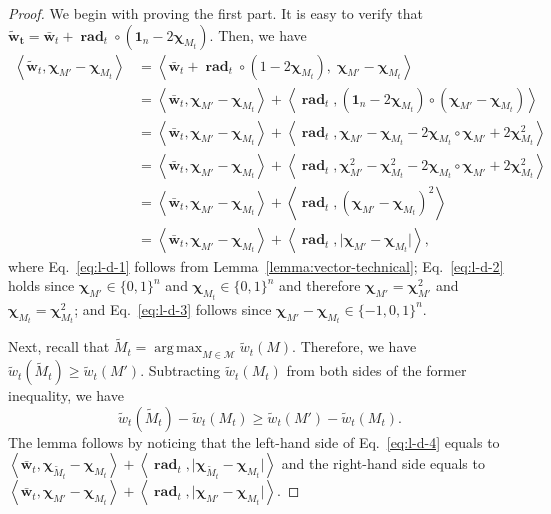 \documentclass{article}
\newcommand{\M}{\mathcal M}
\DeclareMathOperator{\rad}{rad}
\DeclareMathOperator*{\argmax}{arg\,max}
\newcommand{\inn}[1]{\left\langle #1 \right\rangle}
\renewcommand{\vec}[1]{\boldsymbol{#1}}
\renewcommand{\odot}{\circ}
\begin{document}
\begin{spacing}{1.1}
\begin{proof}
We begin with proving the first part.
It is easy to verify that $\vec {\tilde w_t} = \vec {\bar w}_t+ \vec \rad_t \odot (\vec 1_n-2\vec\chi_{M_t})$.
Then, we have
\begin{align}
\inn{\vec{\tilde w}_t, \vec \chi_{M'}-\vec \chi_{M_t}}
&= \inn{\vec {\bar w}_t+ \vec \rad_t \odot (1-2\vec\chi_{M_t}), \;\vec \chi_{M'}-\vec \chi_{M_t}} \nonumber \\
&= \inn{\vec {\bar w}_t,\vec \chi_{M'}-\vec \chi_{M_t}}+\inn{\vec \rad_t, (\vec 1_n-2\vec\chi_{M_t}) \odot (\vec \chi_{M'}-\vec \chi_{M_t})}
\label{eq:l-d-1}\\
&= \inn{\vec {\bar w}_t,\vec \chi_{M'}-\vec \chi_{M_t}}+\inn{\vec \rad_t, \vec\chi_{M'}-\vec\chi_{M_t}-2\vec\chi_{M_t}\odot\vec\chi_{M'}+2\vec\chi_{M_t}^2 } \nonumber\\
&= \inn{\vec {\bar w}_t,\vec \chi_{M'}-\vec \chi_{M_t}}+\inn{\vec \rad_t, \vec\chi_{M'}^2-\vec\chi_{M_t}^2-2\vec\chi_{M_t}\odot\vec\chi_{M'}+2\vec\chi_{M_t}^2 }
\label{eq:l-d-2}\\
&= \inn{\vec {\bar w}_t,\vec \chi_{M'}-\vec \chi_{M_t}}+\inn{\vec \rad_t, (\vec\chi_{M'}-\vec\chi_{M_t})^2}
\nonumber \\ \
&= \inn{\vec {\bar w}_t,\vec \chi_{M'}-\vec \chi_{M_t}}+\inn{\vec \rad_t, \big|\vec\chi_{M'}-\vec\chi_{M_t}\big|},
\label{eq:l-d-3}
\end{align}
where
Eq.~\eqref{eq:l-d-1} follows from Lemma~\ref{lemma:vector-technical};
Eq.~\eqref{eq:l-d-2} holds since $\vec \chi_{M'}\in \{0,1\}^n$ and $\vec \chi_{M_t}\in \{0,1\}^n$
and therefore $\vec\chi_{M'}=\vec\chi_{M'}^2$ and $\vec\chi_{M_t}=\vec\chi_{M_t}^2$;
and Eq.~\eqref{eq:l-d-3} follows since $\vec\chi_{M'}-\vec\chi_{M_t}\in \{-1,0,1\}^n$.

Next, recall that $\tilde M_t = \argmax_{M\in \M} \tilde w_t(M)$.
Therefore, we have $\tilde w_t(\tilde M_t) \ge \tilde w_t(M')$.
Subtracting $\tilde w_t(M_t)$ from both sides of the former inequality, we have
\begin{equation}
\tilde w_t(\tilde M_t)-\tilde w_t(M_t) \ge \tilde w_t(M')-\tilde w_t(M_t).
\label{eq:l-d-4}
\end{equation}
The lemma follows by noticing that the left-hand side of Eq.~\eqref{eq:l-d-4} equals to 
$\inn{\vec {\bar w}_t,\vec \chi_{\tilde M_t}-\vec \chi_{M_t}}+\inn{\vec \rad_t, \big|\vec\chi_{\tilde M_t}-\vec\chi_{M_t}\big|}$
and the right-hand side equals to
$\inn{\vec {\bar w}_t,\vec \chi_{M'}-\vec \chi_{M_t}}+\inn{\vec \rad_t, \big|\vec\chi_{M'}-\vec\chi_{M_t}\big|}$.
\end{proof}



\end{spacing}
\end{document}
